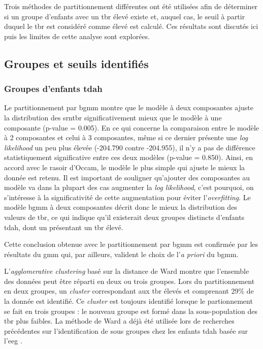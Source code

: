 Trois méthodes de partitionnement différentes ont été utilisées afin de déterminer si un groupe d'enfants avec un \gls{tbr} élevé existe et, auquel cas, 
le seuil à partir duquel le \gls{tbr} est considéré comme élevé est calculé. Ces résultats sont discutés ici puis les limites de cette analyse sont 
explorées.

\subsection{Groupes et seuils identifiés}

\subsubsection{Groupes d'enfants \gls{tdah}}

Le partitionnement par \gls{bgmm} montre que le modèle à deux composantes ajuste la distribution des \gls{srntbr} significativement mieux que le modèle
à une composante (p-value = 0.005). En ce qui concerne la comparaison entre le modèle à 2 composantes et celui à 3 composantes, même si ce dernier présente 
une \textit{log likelihood} un peu plus élevée (-204.790 contre -204.955), il n'y a pas de différence statistiquement significative entre ces deux modèles (p-value
= 0.850). Ainsi, en accord avec le rasoir d'Occam, le modèle le plus simple qui ajuste le mieux la donnée est retenu. Il est important de souligner
qu'ajouter des composantes au modèle va dans la plupart des cas augmenter la \textit{log likelihood}, c'est pourquoi, on s'intéresse à 
la significativité de cette augmentation pour éviter l'\textit{overfitting}. Le modèle \gls{bgmm} à deux composantes décrit donc le mieux la distribution
des valeurs de \gls{tbr}, ce qui indique qu'il existerait deux groupes distincts d'enfants \gls{tdah}, dont un présentant un \gls{tbr} élevé.

Cette conclusion obtenue avec le partitionnement par \gls{bgmm} est confirmée par les résultats du \gls{gmm} qui, par ailleurs, valident le choix de 
l'\textit{a priori} du \gls{bgmm}. 

L'\textit{agglomerative clustering} basé sur la distance de Ward montre que l'ensemble des données peut être réparti 
en deux ou trois groupes. Lors du partitionnement en deux groupes, un \textit{cluster} correspondant aux \gls{tbr} élevés et comprenant 29\% de la donnée
est identifié. Ce \textit{cluster} est toujours identifié lorsque le partionnement se fait en trois groupes : le nouveau groupe est formé dans la sous-population
des \gls{tbr} plus faibles. La méthode de Ward a déjà été utilisée lors de recherches 
précédentes sur l'identification de sous groupes chez les enfants \gls{tdah} basée sur l'\gls{eeg} \citep{Clarke2011}. 

